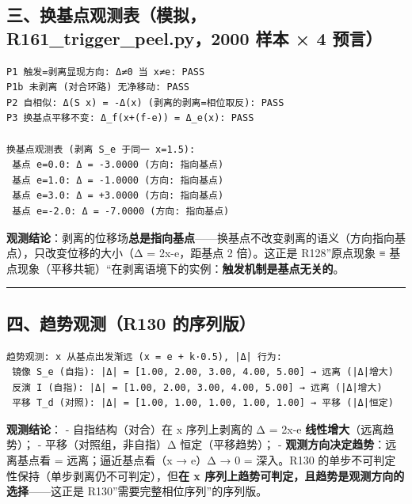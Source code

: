 \documentclass[
]{article}
\begin{document}
\subsection{三、换基点观测表（模拟，R161\_trigger\_peel.py，2000 样本 ×
4
预言）}\label{ux4e09ux6362ux57faux70b9ux89c2ux6d4bux8868ux6a21ux62dfr161_trigger_peel.py2000-ux6837ux672c-4-ux9884ux8a00}

\begin{verbatim}
P1 触发=剥离显现方向: Δ≠0 当 x≠e: PASS
P1b 未剥离 (对合环路) 无净移动: PASS
P2 自相似: Δ(S x) = -Δ(x) (剥离的剥离=相位取反): PASS
P3 换基点平移不变: Δ_f(x+(f-e)) = Δ_e(x): PASS

换基点观测表 (剥离 S_e 于同一 x=1.5):
 基点 e=0.0: Δ = -3.0000 (方向: 指向基点)
 基点 e=1.0: Δ = -1.0000 (方向: 指向基点)
 基点 e=3.0: Δ = +3.0000 (方向: 指向基点)
 基点 e=-2.0: Δ = -7.0000 (方向: 指向基点)
\end{verbatim}

\textbf{观测结论}：剥离的位移场\textbf{总是指向基点}------换基点不改变剥离的语义（方向指向基点），只改变位移的大小（\textbar Δ\textbar{}
= 2\textbar x-e\textbar，距基点 2 倍）。这正是 R128''原点现象 ≡
基点现象（平移共轭）``在剥离语境下的实例：\textbf{触发机制是基点无关的}。

\begin{center}\rule{0.5\linewidth}{0.5pt}\end{center}

\subsection{四、趋势观测（R130
的序列版）}\label{ux56dbux8d8bux52bfux89c2ux6d4br130-ux7684ux5e8fux5217ux7248}

\begin{verbatim}
趋势观测: x 从基点出发渐远 (x = e + k·0.5), |Δ| 行为:
 镜像 S_e (自指): |Δ| = [1.00, 2.00, 3.00, 4.00, 5.00] → 远离 (|Δ|增大)
 反演 I (自指): |Δ| = [1.00, 2.00, 3.00, 4.00, 5.00] → 远离 (|Δ|增大)
 平移 T_d (对照): |Δ| = [1.00, 1.00, 1.00, 1.00, 1.00] → 平移 (|Δ|恒定)
\end{verbatim}

\textbf{观测结论}： - 自指结构（对合）在 x 序列上剥离的
\textbar Δ\textbar{} = 2\textbar x-e\textbar{}
\textbf{线性增大}（远离趋势）； -
平移（对照组，非自指）\textbar Δ\textbar{} 恒定（平移趋势）； -
\textbf{观测方向决定趋势}：远离基点看 = 远离；逼近基点看（x →
e）\textbar Δ\textbar{} → 0 = 深入。R130
的单步不可判定性保持（单步剥离仍不可判定），但\textbf{在 x
序列上趋势可判定，且趋势是观测方向的选择}------这正是
R130''需要完整相位序列''的序列版。
\end{document}
